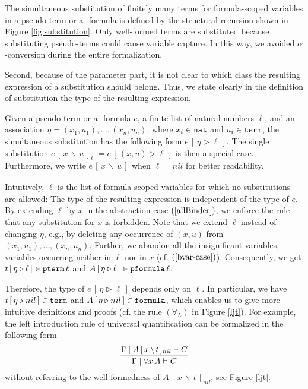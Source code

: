 \documentclass{svjour3}                     %
\newcommand{\seq}[2]{\infer{#2}{#1}}
\newcommand{\al}{\alpha}
\newcommand{\Ga}{\Gamma}
\newcommand{\vd}{\vdash}
\newcommand{\substa}[3]{#1\,[\,#2 \triangleright #3\,]}
\newcommand{\subst}[4]{#1\,[\,#2\, \backslash\, #3\,]_{#4}}
\newcommand{\tnat}{\textup{\tt nat}}
\newcommand{\tpterm}{\textup{\tt pterm}}
\newcommand{\tpfml}{\textup{\tt pformula}}
\newcommand{\tterm}{\textup{\tt term}}
\newcommand{\tfml}{\textup{\tt formula}}
\begin{document}
The simultaneous substitution of finitely many terms for formula-scoped variables in a pseudo-term or a -formula is defined by the structural recursion shown in Figure \ref{fig:substitution}. Only well-formed terms are substituted because substituting pseudo-terms could cause variable capture. In this way, we avoided $\al$-conversion during the entire formalization. 

Second, because of the parameter part, it is not clear to which class the resulting expression of a substitution should belong. Thus, we state clearly in the definition of substitution the type of the resulting expression.

Given a pseudo-term or a -formula $e$, a finite list of natural numbers $\ell$, and an association $\eta = (x_1, u_1), ..., (x_n,u_n)$, where $x_i \in \tnat$ and $u_i\in \tterm$, the simultaneous substitution has the following form 
$
\substa{e}{\eta}{\ell}.
$
The single substitution $\subst{e}{x}{u}{\ell} := \substa{e}{(x,u)}{\ell}$ is then a special case. Furthermore, we write $\subst{e}{x}{u}{}$ when $\ell = nil$ for better readability.

Intuitively, $\ell$ is the list of formula-scoped variables for which no substitutions are allowed: The type of the resulting expression is independent of the type of $e$.
By extending $\ell$ by $x$ in the abstraction case $(\ref{allBinder})$, we enforce the rule that any substitution for $x$ is forbidden. Note that we extend $\ell$ instead of changing $\eta$, e.g., by deleting any occurrence of $(x,u)$ from $(x_1, u_1), ..., (x_n,u_n)$. 
Further, we abandon all the insignificant variables, variables occurring neither in $\ell$ nor in $\bar x$ (cf. $(\ref{bvar-case})$). Consequently, we get $\substa{t}{\eta}{\ell} \in \tpterm\, \ell$ and $\substa{A}{\eta}{\ell} \in \tpfml\, \ell$.

Therefore, the type of $\substa{e}{\eta}{\ell}$ depends only on $\ell$.
In particular, we have $\substa{t}{\eta}{nil} \in \tterm$ and $\substa{A}{\eta}{nil} \in \tfml$, which enables us to give more intuitive definitions and proofs (cf. the rule $(\forall_L)$ in Figure \ref{ljt}).
For example, the left introduction rule of universal quantification can be formalized in the following form
\[
\seq{\Ga\mid \subst{A}{x}{t}{nil} \vd C}{\Ga\mid \forall x\, A \vd C}
\]
without referring to the well-formedness of $\subst{A}{x}{t}{nil}$, see Figure \ref{ljt}.
\end{document}

